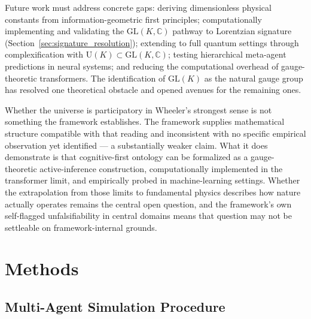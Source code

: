 \documentclass[11pt]{article}
\begin{document}
Future work must address concrete gaps: deriving dimensionless physical constants from information-geometric first principles; computationally implementing and validating the $\mathrm{GL}(K, \mathbb{C})$ pathway to Lorentzian signature (Section~\ref{sec:signature_resolution}); extending to full quantum settings through complexification with $\mathrm{U}(K) \subset \mathrm{GL}(K, \mathbb{C})$; testing hierarchical meta-agent predictions in neural systems; and reducing the computational overhead of gauge-theoretic transformers. The identification of $\mathrm{GL}(K)$ as the natural gauge group has resolved one theoretical obstacle and opened avenues for the remaining ones.

Whether the universe is participatory in Wheeler's strongest sense is not something the framework establishes. The framework supplies mathematical structure compatible with that reading and inconsistent with no specific empirical observation yet identified --- a substantially weaker claim. What it does demonstrate is that cognitive-first ontology can be formalized as a gauge-theoretic active-inference construction, computationally implemented in the transformer limit, and empirically probed in machine-learning settings. Whether the extrapolation from those limits to fundamental physics describes how nature actually operates remains the central open question, and the framework's own self-flagged unfalsifiability in central domains means that question may not be settleable on framework-internal grounds.

\section{Methods}
\label{sec:methods}

\subsection{Multi-Agent Simulation Procedure}
\label{sec:methods_metagent}
\end{document}
